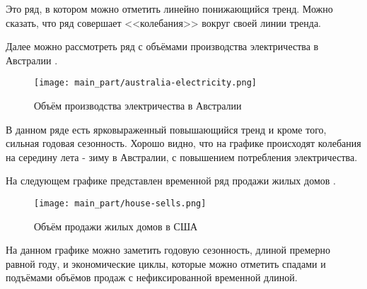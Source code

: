 Это ряд, в котором можно отметить линейно понижающийся тренд. Можно сказать, что ряд совершает <<колебания>> вокруг своей линии тренда.

Далее можно рассмотреть ряд с объёмами производства электричества в Австралии \cite{datamining_in_action}.

\begin{figure}[h]
\centering
	\texttt{[image: main\_part/australia-electricity.png]}
	\caption{Объём производства электричества в Австралии}
	\label{sec:purpose:electricity}
\end{figure}

В данном ряде есть ярковыраженный повышающийся тренд и кроме того, сильная годовая сезонность. Хорошо видно, что на графике происходят колебания на середину лета - зиму в Австралии, с повышением потребления электричества.

На следующем графике представлен временной ряд продажи жилых домов \cite{datamining_in_action}.

\begin{figure}[h]
\centering
	\texttt{[image: main\_part/house-sells.png]}
	\caption{Объём продажи жилых домов в США}
	\label{sec:purpose:house-sells}
\end{figure}

На данном графике можно заметить годовую сезонность, длиной премерно равной году, и экономические циклы, которые можно отметить спадами и подъёмами объёмов продаж с нефиксированной временной длиной.




